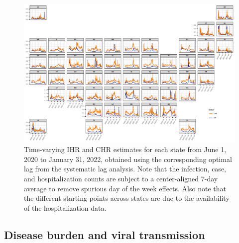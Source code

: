 \documentclass{article}
\begin{document}

\begin{landscape}
\thispagestyle{empty}
\begin{figure}[!tb]
    \centering
   \includegraphics[width=.99\linewidth]{IHR_7dav_Oct23.pdf}
    \caption{Time-varying IHR and CHR estimates for each state from June 1, 2020
    to January 31, 2022, obtained using the corresponding optimal lag from the
    systematic lag analysis. Note that the infection, case, and hospitalization
    counts are subject to a center-aligned 7-day average to remove spurious day
    of the week effects. Also note that the different starting points across
    states are due to the availability of the hospitalization data.}
    \label{fig:IHR_7dav}
\fillandplacepagenumber
\end{figure}
\end{landscape}

\subsection{Disease burden and viral transmission}
\end{document}
